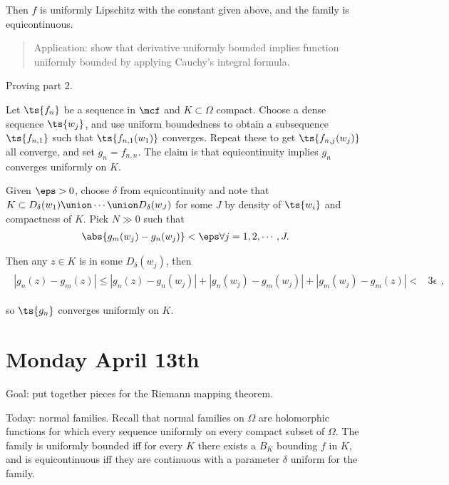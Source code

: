Then \(f\) is uniformly Lipschitz with the constant given above, and the
family is equicontinuous.

\begin{quote}
Application: show that derivative uniformly bounded implies function
uniformly bounded by applying Cauchy's integral formula.
\end{quote}

Proving part 2.

Let \(\ts{f_n}\) be a sequence in \(\mcf\) and \(K\subset \Omega\)
compact. Choose a dense sequence \(\ts{w_j}\), and use uniform
boundedness to obtain a subsequence \(\ts{f_{n, 1} }\) such that
\(\ts{f_{n, 1}(w_1)}\) converges. Repeat these to get
\(\ts{f_{n, j}(w_j)}\) all converge, and set \(g_n = f_{n, n}\). The
claim is that equicontinuity implies \(g_n\) converges uniformly on
\(K\).

Given \(\eps>0\), choose \(\delta\) from equicontinuity and note that
\(K \subset D_\delta(w_1) \union \cdots \union D_\delta(w_J)\) for some
\(J\) by density of \(\ts{w_i}\) and compactness of \(K\). Pick
\(N \gg 0\) such that \begin{align*}
\abs{g_m(w_j) - g_n(w_j)} < \eps \forall j=1,2,\cdots, J
.\end{align*}

Then any \(z\in K\) is in some \(D_\delta(w_j)\), then \begin{align*}
\begin{aligned}
\left|g_{n}(z)-g_{m}(z)\right| \leq \left|g_{n}(z)-g_{n}\left(w_{j}\right)\right|+\left|g_{n}\left(w_{j}\right)-g_{m}\left(w_{j}\right)\right|+\left|g_{m}\left(w_{j}\right)-g_{m}(z)\right| <& 3 \epsilon
\end{aligned}
,\end{align*}

so \(\ts{g_n}\) converges uniformly on \(K\).

\hypertarget{monday-april-13th}{%
\section{Monday April 13th}\label{monday-april-13th}}

Goal: put together pieces for the Riemann mapping theorem.

Today: normal families. Recall that normal families on \(\Omega\) are
holomorphic functions for which every sequence uniformly on every
compact subset of \(\Omega\). The family is uniformly bounded iff for
every \(K\) there exists a \(B_K\) bounding \(f\) in \(K\), and is
equicontinuous iff they are continuous with a parameter \(\delta\)
uniform for the family.

